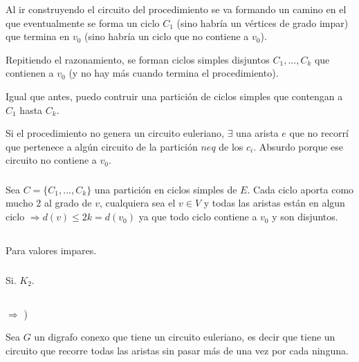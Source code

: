 Al ir construyendo el circuito del procedimiento se va formando un camino en el que eventualmente se forma un ciclo $C_1$ (sino habría un vértices de grado impar) que termina en $v_0$ (sino habría un ciclo que no contiene a $v_0$).

Repitiendo el razonamiento, se forman ciclos simples disjuntos $C_1, ..., C_k$ que contienen a $v_0$ (y no hay más cuando termina el procedimiento).

Igual que antes, puedo contruir una partición de ciclos simples que contengan a $C_1$ hasta $C_k$.

Si el procedimiento no genera un circuito euleriano, $\exists$ una arista $e$ que no recorrí que pertenece a algún circuito de la partición $neq$ de los $c_i$. Absurdo porque ese circuito no contiene a $v_0$.

\subsubsection{}

Sea $C = \{C_1, ..., C_k\}$ una partición en ciclos simples de $E$. Cada ciclo aporta como mucho 2 al grado de $v$, cualquiera sea el $v \in V$ y todas las aristas están en algun ciclo $\Longrightarrow d(v) \leq 2k = d(v_0)$ ya que todo ciclo contiene a $v_0$ y son disjuntos.

\subsection{}

\subsubsection{}
Para valores impares.

\subsubsection{}
Si. $K_2$.

\subsection{}

\subsubsection{}

$\Longrightarrow$ )

Sea $G$ un digrafo conexo que tiene un circuito euleriano, es decir que tiene un circuito que recorre todas las aristas sin pasar más de una vez por cada ninguna. 

